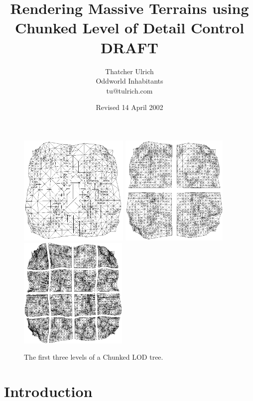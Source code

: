 \documentclass[12pt]{article}
\title{Rendering Massive Terrains using Chunked Level of Detail Control\\DRAFT}
\author{
        Thatcher Ulrich\\
        Oddworld Inhabitants\\
        tu@tulrich.com\\
}
\date{Revised 14 April 2002}
\begin{document}
\maketitle


\begin{figure}[h]
\centering
\includegraphics[height=2.1in]{sig-fig-tree1}
\includegraphics[height=2.1in]{sig-fig-tree2}
\includegraphics[height=2.1in]{sig-fig-tree3}
\caption{The first three levels of a Chunked LOD tree.}
\label{fig:tree}
\end{figure}


\section{Introduction}
\end{document}
